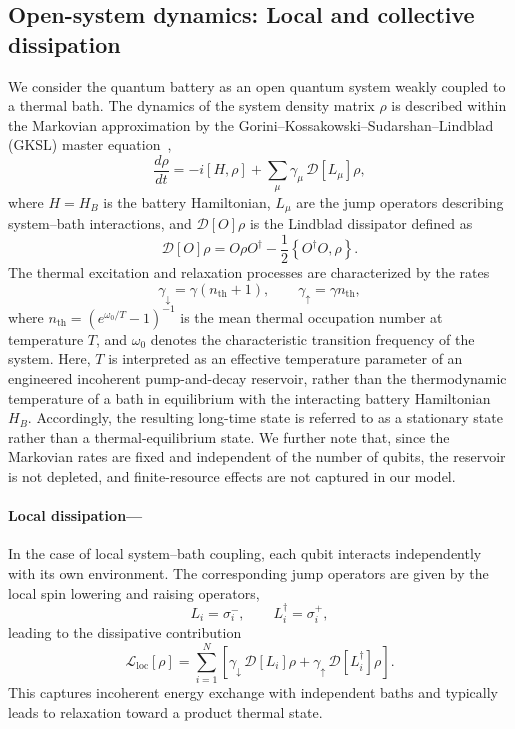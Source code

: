 \documentclass[aps,superscriptaddress,twocolumn,pre,longbibliography,floatfix]{revtex4-1}
\begin{document}
	\subsection{Open-system dynamics: Local and collective dissipation}\label{sec:open_system}
	We consider the quantum battery as an open quantum system weakly coupled to a thermal bath. The dynamics of the system density matrix $\rho$ is described within the Markovian approximation by the Gorini--Kossakowski--Sudarshan--Lindblad (GKSL) master equation~\cite{Breuer},
	\begin{equation}
		\frac{d\rho}{dt}= -i[H,\rho] + \sum_{\mu}
		\gamma_\mu \, \mathcal{D}[L_\mu]\rho,
	\end{equation}
	where $H = H_B$ is the battery Hamiltonian, $L_\mu$ are the jump operators describing system--bath interactions, and $\mathcal{D}[O]\rho$ is the Lindblad dissipator defined as
	\begin{equation}
		\mathcal{D}[O]\rho = O\rho O^\dagger - \frac{1}{2} \left\{ O^\dagger O,\rho \right\}.
	\end{equation}
	The thermal excitation and relaxation processes are characterized by the rates
	\begin{equation}
		\gamma_{\downarrow} = \gamma (n_{\mathrm{th}} + 1), 
		\qquad
		\gamma_{\uparrow} = \gamma n_{\mathrm{th}},
	\end{equation}
	where $n_{\mathrm{th}} = (e^{\omega_0/T} - 1)^{-1}$ is the mean thermal occupation number at temperature $T$, and $\omega_0$ denotes the characteristic transition frequency of the system. Here, $T$ is interpreted as an effective temperature parameter of an engineered incoherent pump-and-decay reservoir, rather than the thermodynamic temperature of a bath in equilibrium with the interacting battery Hamiltonian $H_B$. Accordingly, the resulting long-time state is referred to as a stationary state rather than a thermal-equilibrium state. We further note that, since the Markovian rates are fixed and independent of the number of qubits, the reservoir is not depleted, and finite-resource effects are not captured in our model.
	\paragraph*{Local dissipation---}
	In the case of local system--bath coupling, each qubit interacts independently with its own environment. The corresponding jump operators are given by the local spin lowering and raising operators,
	\begin{equation}\label{OPINT_LOC}
		L_i = \sigma_i^-,
		\qquad
		L_i^\dagger = \sigma_i^+,
	\end{equation}
	leading to the dissipative contribution
	\begin{equation}
		\mathcal{L}_{\mathrm{loc}}[\rho] = \sum_{i=1}^N
		\left[ \gamma_{\downarrow} \, \mathcal{D}[L_i]\rho + \gamma_{\uparrow} \, \mathcal{D}[L_i^\dagger]\rho
		\right].
	\end{equation}
	This captures incoherent energy exchange with independent baths and typically leads to relaxation toward a product thermal state. 
\end{document}
